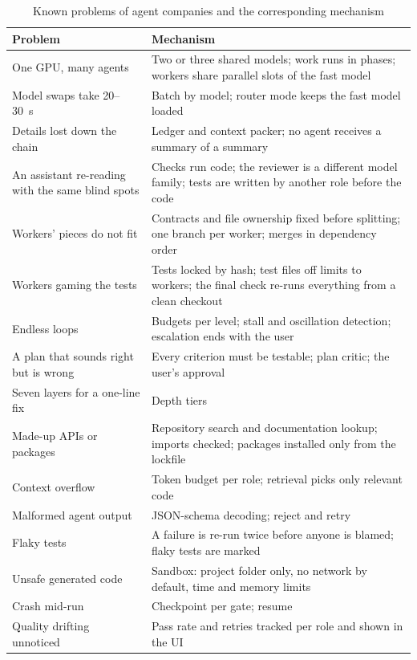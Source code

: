 \begin{table}[t]
\caption{Known problems of agent companies and the corresponding mechanism}
\label{tab:problems}
\centering\footnotesize
\begin{tabularx}{\columnwidth}{@{}L{27mm}Y@{}}
\toprule
Problem & Mechanism \\
\midrule
One GPU, many agents & Two or three shared models; work runs in phases; workers share parallel slots of the fast model \\
Model swaps take 20--30~s & Batch by model; router mode keeps the fast model loaded \\
Details lost down the chain & Ledger and context packer; no agent receives a summary of a summary \\
An assistant re-reading with the same blind spots & Checks run code; the reviewer is a different model family; tests are written by another role before the code \\
Workers' pieces do not fit & Contracts and file ownership fixed before splitting; one branch per worker; merges in dependency order \\
Workers gaming the tests & Tests locked by hash; test files off limits to workers; the final check re-runs everything from a clean checkout \\
Endless loops & Budgets per level; stall and oscillation detection; escalation ends with the user \\
A plan that sounds right but is wrong & Every criterion must be testable; plan critic; the user's approval \\
Seven layers for a one-line fix & Depth tiers \\
Made-up APIs or packages & Repository search and documentation lookup; imports checked; packages installed only from the lockfile \\
Context overflow & Token budget per role; retrieval picks only relevant code \\
Malformed agent output & JSON-schema decoding; reject and retry \\
Flaky tests & A failure is re-run twice before anyone is blamed; flaky tests are marked \\
Unsafe generated code & Sandbox: project folder only, no network by default, time and memory limits \\
Crash mid-run & Checkpoint per gate; resume \\
Quality drifting unnoticed & Pass rate and retries tracked per role and shown in the UI \\
\bottomrule
\end{tabularx}
\end{table}

